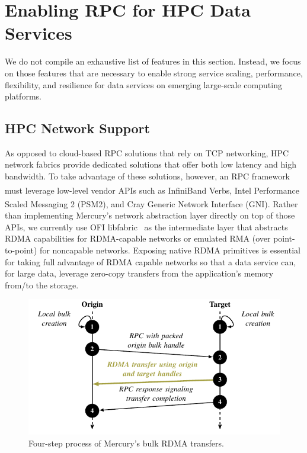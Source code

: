\documentclass[11pt]{article}
\begin{document}
\section{Enabling RPC for HPC Data Services}
\label{sec:design}

We do not compile an exhaustive list of features in this section.
%
Instead, we focus on those features that are necessary to enable strong service scaling,
performance, flexibility, and resilience for data services on emerging
large-scale computing platforms.

\subsection{HPC Network Support}
\label{sec:rdma}

As opposed to cloud-based RPC solutions that rely on TCP networking,
HPC network fabrics provide dedicated solutions that offer both
low latency and high bandwidth. To take advantage of these solutions, however, 
an RPC framework must leverage low-level vendor APIs such as InfiniBand{\small \texttrademark} Verbs,
Intel{\textsuperscript{\textregistered}} Performance Scaled Messaging 2 (PSM2),
and Cray{\textsuperscript{\textregistered}} Generic Network Interface (GNI).
Rather than implementing Mercury's network
abstraction layer directly on top of those APIs, we currently use
OFI libfabric~\cite{Grun2015} as
the intermediate layer that abstracts RDMA capabilities for RDMA-capable
networks or emulated RMA (over point-to-point) for noncapable networks.
Exposing native RDMA primitives is essential for taking full advantage of RDMA
capable networks so that a data service can, for large data, leverage zero-copy
transfers from the application's memory from/to the storage.

\begin{figure}[h]
\centering
\includegraphics{figs/bulk_rdma}
\vspace{-5pt}
\caption{Four-step process of Mercury's bulk RDMA transfers.}
\label{fig:bulk_rdma}
\vspace{-10pt}
\end{figure}
\end{document}
